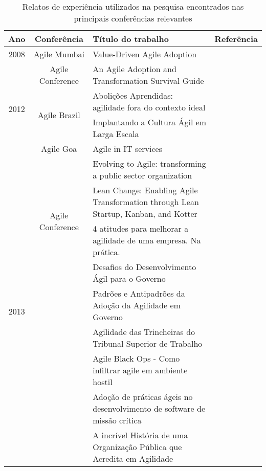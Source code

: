 \begin{table}[H]
	\centering
	\captionsetup{justification=centering,margin=1cm}
	\begin{tabular}{| c | c | m{8cm} | m{2.5cm} |} \hline \textbf{Ano} & \textbf{Conferência}  & \textbf{Título do trabalho} & \textbf{Referência} \\ \hline
		\multirow{1}{*}{2008}
			& Agile Mumbai & Value-Driven Agile Adoption & \cite{Ahmed2008} \\ \cline{2-4}
		\hline \hline
		\multirow{4}{*}{2012}
			& \multirow{1}{*}{Agile Conference}
				& An Agile Adoption and Transformation Survival Guide & \cite{Sahota2012} \\ \cline{2-4}
			& \multirow{2}{*}{Agile Brazil}
				& Abolições Aprendidas: agilidade fora do contexto ideal & \cite{Piegas2012} \\ \cline{3-4}
				&& Implantando a Cultura Ágil em Larga Escala & \cite{Parzinello2012} \\ \cline{2-4}
			& \multirow{1}{*}{Agile Goa}
				& Agile in IT services & \cite{Srinath2012} \\ \cline{2-4}
		\hline \hline
		\multirow{18}{*}{2013}
			& \multirow{4}{*}{Agile Conference}
				& Evolving to Agile: transforming a public sector organization & \cite{Karaj2013} \\ \cline{3-4}
				&& Lean Change: Enabling Agile Transformation through Lean Startup, Kanban, and Kotter & \cite{Hui2013} \\ \cline{2-4}
			& \multirow{12}{*}{Agile Brazil}
				& 4 atitudes para melhorar a agilidade de uma empresa. Na prática. & \cite{Valerio2013} \\ \cline{3-4}
				&& Desafios do Desenvolvimento Ágil para o Governo & \cite{Stefano2013} \\ \cline{3-4}
				&& Padrões e Antipadrões da Adoção da Agilidade em Governo & \cite{Rodrigues2013} \\ \cline{3-4}
				&& Agilidade das Trincheiras do Tribunal Superior de Trabalho & \cite{Vieira2013} \\ \cline{3-4}
				&& Agile Black Ops - Como infiltrar agile em ambiente hostil & \cite{Queiroz2013} \\ \cline{3-4}
				&& Adoção de práticas ágeis no desenvolvimento de software de missão crítica & \cite{Bastos2013} \\ \cline{3-4}
				&& A incrível História de uma Organização Pública que Acredita em Agilidade & \cite{Maciel2013} \\ \cline{2-4}
		\hline
	\end{tabular}
	\caption{Relatos de experiência utilizados na pesquisa encontrados nas principais conferências relevantes}
	\label{tab:relatosEncontrados}
\end{table}

